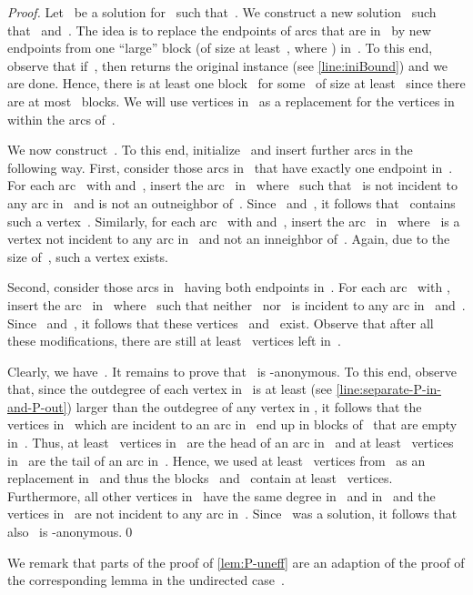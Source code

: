\documentclass[a4paper,11pt]{article}
\theoremstyle{remark}
\theoremstyle{plain}
\theoremstyle{definition}
\begin{document}
\begin{proof}
	Let~ be a solution for~ such that~.
	We construct a new solution~ such that~ and~.
	The idea is to replace the endpoints of arcs that are in~ by new endpoints from one ``large'' block (of size at least~, where ) in~.
	To this end, observe that if~, then  returns the original instance (see \cref{line:iniBound}) and we are done. 
	Hence, there is at least one block~ for some~ of size at least~ since there are at most~ blocks.
	We will use vertices in~ as a replacement for the vertices in~ within the arcs of~.
	
	We now construct~.
	To this end, initialize~ and insert further arcs in the following way.
	First, consider those arcs in~ that have exactly one endpoint in~.
	For each arc~ with  and~, insert the arc~ in~ where~ such that~ is not incident to any arc in~ and is not an outneighbor of~.
	Since~ and~, it follows that~ contains such a vertex~. 
	Similarly, for each arc~ with  and~, insert the arc~ in~ where~ is a vertex not incident to any arc in~ and not an inneighbor of~.
	Again, due to the size of~, such a vertex exists.
	
	Second, consider those arcs in~ having both endpoints in~.
	For each arc~ with , insert the arc~ in~ where~ such that neither~ nor~ is incident to any arc in~ and~.
	Since~ and~, it follows that these vertices~ and~ exist.
	Observe that after all these modifications, there are still at least~ vertices left in~.
	
	Clearly, we have~.
	It remains to prove that~ is -anonymous.
	To this end, observe that, since the outdegree of each vertex in~ is at least  (see \cref{line:separate-P-in-and-P-out}) larger than the outdegree of any vertex in , it follows that the vertices in~ which are incident to an arc in~ end up in blocks of~ that are empty in~.
	Thus, at least~ vertices in~ are the head of an arc in~ and at least~ vertices in~ are the tail of an arc in~.
	Hence, we used at least~ vertices from~ as an replacement in~ and thus the blocks~ and~ contain at least~ vertices.
	Furthermore, all other vertices in~ have the same degree in~ and in~ and the vertices in~ are not incident to any arc in~.
	Since~ was a solution, it follows that also~ is -anonymous.\qed
\end{proof}

We remark that parts of the proof of \cref{lem:P-uneff} are an adaption of the proof of the corresponding lemma in the undirected case~\cite[Lemma 6]{HNNS15}.
\end{document}
